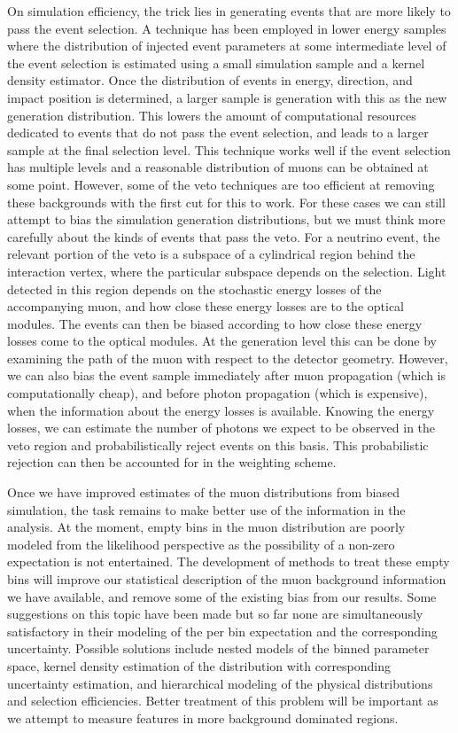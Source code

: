 On simulation efficiency, the trick lies in generating events that are more likely to pass the event selection.
A technique has been employed in lower energy samples where the distribution of injected event parameters at some intermediate level of the event selection is estimated using a small simulation sample and a kernel density estimator.
Once the distribution of events in energy, direction, and impact position is determined, a larger sample is generation with this as the new generation distribution.
This lowers the amount of computational resources dedicated to events that do not pass the event selection, and leads to a larger sample at the final selection level.
This technique works well if the event selection has multiple levels and a reasonable distribution of muons can be obtained at some point.
However, some of the veto techniques are too efficient at removing these backgrounds with the first cut for this to work.
For these cases we can still attempt to bias the simulation generation distributions, but we must think more carefully about the kinds of events that pass the veto.
For a neutrino event, the relevant portion of the veto is a subspace of a cylindrical region behind the interaction vertex, where the particular subspace depends on the selection.
Light detected in this region depends on the stochastic energy losses of the accompanying muon, and how close these energy losses are to the optical modules.
The events can then be biased according to how close these energy losses come to the optical modules.
At the generation level this can be done by examining the path of the muon with respect to the detector geometry.
However, we can also bias the event sample immediately after muon propagation (which is computationally cheap), and before photon propagation (which is expensive), when the information about the energy losses is available.
Knowing the energy losses, we can estimate the number of photons we expect to be observed in the veto region and probabilistically reject events on this basis.
This probabilistic rejection can then be accounted for in the weighting scheme.

Once we have improved estimates of the muon distributions from biased simulation, the task remains to make better use of the information in the analysis.
At the moment, empty bins in the muon distribution are poorly modeled from the likelihood perspective as the possibility of a non-zero expectation is not entertained.
The development of methods to treat these empty bins will improve our statistical description of the muon background information we have available, and remove some of the existing bias from our results.
Some suggestions on this topic have been made but so far none are simultaneously satisfactory in their modeling of the per bin expectation and the corresponding uncertainty.
Possible solutions include nested models of the binned parameter space, kernel density estimation of the distribution with corresponding uncertainty estimation, and hierarchical modeling of the physical distributions and selection efficiencies.
Better treatment of this problem will be important as we attempt to measure features in more background dominated regions.


